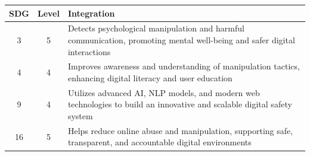 \begin{table}[h]
\centering
\renewcommand{\arraystretch}{1.3}
\begin{tabular}{|c|c|p{11cm}|}
\hline
\textbf{SDG} & \textbf{Level} & \textbf{Integration} \\
\hline
3 & 5 & Detects psychological manipulation and harmful communication, promoting mental well-being and safer digital interactions \\
\hline
4 & 4 & Improves awareness and understanding of manipulation tactics, enhancing digital literacy and user education \\
\hline
9 & 4 & Utilizes advanced AI, NLP models, and modern web technologies to build an innovative and scalable digital safety system \\
\hline
16 & 5 & Helps reduce online abuse and manipulation, supporting safe, transparent, and accountable digital environments \\
\hline
\end{tabular}
\end{table}